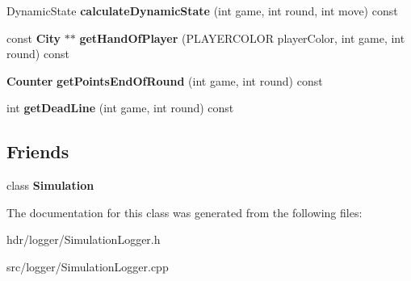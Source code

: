 \begin{DoxyCompactItemize}
\item 
Dynamic\-State {\bfseries calculate\-Dynamic\-State} (int game, int round, int move) const \label{class_simulation_logger_a1929c74a77d05af475b262b65acc4258}

\item 
const {\bf City} $\ast$$\ast$ {\bfseries get\-Hand\-Of\-Player} (P\-L\-A\-Y\-E\-R\-C\-O\-L\-O\-R player\-Color, int game, int round) const \label{class_simulation_logger_ac063a9256c51c6b52a0684392615f7bc}

\item 
{\bf Counter} {\bfseries get\-Points\-End\-Of\-Round} (int game, int round) const \label{class_simulation_logger_acba8730ff613b90317ab11723a1db404}

\item 
int {\bfseries get\-Dead\-Line} (int game, int round) const \label{class_simulation_logger_a5f57d92ada730f8ba5c45901db916035}

\end{DoxyCompactItemize}
\subsection*{Friends}
\begin{DoxyCompactItemize}
\item 
class {\bfseries Simulation}\label{class_simulation_logger_aeb51e0a4c44d4192cfbdb79598859172}

\end{DoxyCompactItemize}


The documentation for this class was generated from the following files\-:\begin{DoxyCompactItemize}
\item 
hdr/logger/Simulation\-Logger.\-h\item 
src/logger/Simulation\-Logger.\-cpp\end{DoxyCompactItemize}
